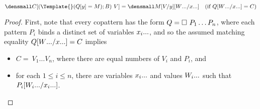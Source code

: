 \begin{lemma}
  \label{thm:context-match}
  \\
  $\den{C[(\Template{} (Q[y] = M); B) ~ V]} = \den{M\subst{y}{V}\subst{\many{x}}{\many{W}}}
  \quad (\text{if } Q\subst{\many{x}}{\many{W}} = C)$
\end{lemma}
\begin{proof}
  First, note that every copattern has the form $Q = \hole ~ P_1 \dots P_n$, where each pattern $P_i$ binds a distinct set of variables $\many{x_i}$, and so the assumed matching equality $Q\subst{\many{x}}{\many{W}} = C$ implies
  \begin{itemize}
  \item $C = ~ V_1 \dots V_n$, where there are equal numbers of $V_i$ and $P_i$, and
  \item for each $1 \leq i \leq n$, there are variables $\many{x_i}$ and values $\many{W_i}$ such that $P_i\subst{\many{x_i}}{\many{W_i}}$.
  \end{itemize}


\end{proof}
